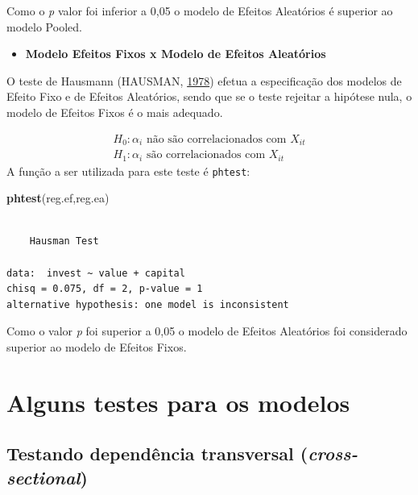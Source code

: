 \documentclass[12pt,brazil,oneside]{book}
\newenvironment{Shaded}{\begin{snugshade}}{\end{snugshade}}
\newcommand{\KeywordTok}[1]{\textcolor[rgb]{0.13,0.29,0.53}{\textbf{#1}}}
\newcommand{\NormalTok}[1]{#1}
\providecommand{\tightlist}{%
  \setlength{\itemsep}{0pt}\setlength{\parskip}{0pt}}
\begin{document}
Como o \emph{p} valor foi inferior a 0,05 o modelo de Efeitos Aleatórios é superior ao modelo Pooled.

\begin{itemize}
\tightlist
\item
  \textbf{Modelo Efeitos Fixos x Modelo de Efeitos Aleatórios}
\end{itemize}

O teste de Hausmann (HAUSMAN, \protect\hyperlink{ref-hausman1978}{1978}) efetua a especificação dos modelos de Efeito Fixo e de Efeitos Aleatórios, sendo que se o teste rejeitar a hipótese nula, o modelo de Efeitos Fixos é o mais adequado.

\[
 \begin{matrix}
H_0: \alpha_{i} \text{ não são correlacionados com } X_{it} \\
H_1: \alpha_{i} \text{ são correlacionados com } X_{it}
 \end{matrix}
\]
A função a ser utilizada para este teste é \texttt{phtest}:

\begin{Shaded}
\begin{Highlighting}[]
\KeywordTok{phtest}\NormalTok{(reg.ef,reg.ea)}
\end{Highlighting}
\end{Shaded}

\begin{verbatim}

    Hausman Test

data:  invest ~ value + capital
chisq = 0.075, df = 2, p-value = 1
alternative hypothesis: one model is inconsistent
\end{verbatim}

Como o valor \emph{p} foi superior a 0,05 o modelo de Efeitos Aleatórios foi considerado superior ao modelo de Efeitos Fixos.

\hypertarget{alguns-testes-para-os-modelos}{%
\section{Alguns testes para os modelos}\label{alguns-testes-para-os-modelos}}

\hypertarget{testando-dependencia-transversal-cross-sectional}{%
\subsection{\texorpdfstring{Testando dependência transversal (\emph{cross-sectional})}{Testando dependência transversal (cross-sectional)}}\label{testando-dependencia-transversal-cross-sectional}}
\end{document}
